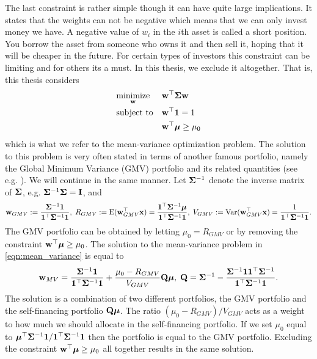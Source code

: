 \documentclass[oneside]{book}\usepackage{knitr}
\begin{document}
The last constraint is rather simple though it can have quite large implications. 
It states that the weights can not be negative which means that we can only invest money we have. 
A negative value of $w_i$ in the $i$th asset is called a short position.
You borrow the asset from someone who owns it and then sell it, hoping that it will be cheaper in the future.
For certain types of investors this constraint can be limiting and for others its a must.
In this thesis, we exclude it altogether. That is, this thesis considers
\begin{equation}\label{eqn:mean_variance}
\begin{aligned}
& \underset{\mathbf{w}}{\text{minimize}} 
& & \mathbf{w}^\top \mathbf{\Sigma} \mathbf{w} \\
& \text{subject to}
& & \mathbf{w}^\top \mathbf{1} = 1 \\
& && \mathbf{w}^\top \mbox{\boldmath$\mu$} \geq \mu_0 \\
\end{aligned}
\end{equation}
which is what we refer to the mean-variance optimization problem. The solution to this problem is very often stated in terms of another famous portfolio, namely the Global Minimum Variance (GMV) portfolio and its related quantities (see e.g. \textcite{Bodnar2009CaIotEFiEM, bodnar2013equivalence, bauder2018bayesian}). We will continue in the same manner. Let $\mathbf{\Sigma}^{-1}$ denote the inverse matrix of $\mathbf{\Sigma}$, e.g. $\mathbf{\Sigma}^{-1}\mathbf{\Sigma} = \mathbf{I}$, and
\begin{equation}
	\mathbf{w}_{GMV} := \frac{\mathbf{\Sigma}^{-1}\mathbf{1}}{\mathbf{1}^\top \mathbf{\Sigma}^{-1}\mathbf{1}}, \; R_{GMV} :=\operatorname{E}(\mathbf{w}_{GMV}^\top\mathbf{x}) = \frac{\mathbf{1}^\top\mathbf{\Sigma}^{-1}\mbox{\boldmath$\mu$}}{\mathbf{1}^\top \mathbf{\Sigma}^{-1}\mathbf{1}}, \;
	V_{GMV} := \operatorname{Var}(\mathbf{w}_{GMV}^\top\mathbf{x}) =\frac{1}{\mathbf{1}^\top \mathbf{\Sigma}^{-1}\mathbf{1}}.
\end{equation}
The GMV portfolio can be obtained by letting $\mu_0=R_{GMV}$ or by removing the constraint $\mathbf{w}^\top \mbox{\boldmath$\mu$} \geq \mu_0$. The solution to the mean-variance problem in \eqref{eqn:mean_variance} is equal to
\begin{equation}\label{eqn:mean_var_solution}
	\mathbf{w}_{MV} = \frac{\mathbf{\Sigma}^{-1}\mathbf{1}}{\mathbf{1}^\top \mathbf{\Sigma}^{-1}\mathbf{1}} + \frac{\mu_0 - R_{GMV}}{V_{GMV}} \mathbf{Q} \mbox{\boldmath$\mu$},\; \mathbf{Q} = \mathbf{\Sigma}^{-1} - \frac{\mathbf{\Sigma}^{-1} \mathbf{1} \mathbf{1}^\top \mathbf{\Sigma}^{-1}}{\mathbf{1}^\top \mathbf{\Sigma}^{-1} \mathbf{1}}.
\end{equation}
The solution is a combination of two different portfolios, the GMV portfolio and the self-financing portfolio $\mathbf{Q} \mbox{\boldmath$\mu$}$. The ratio $(\mu_0 - R_{GMV})/V_{GMV}$ acts as a weight to how much we should allocate in the self-financing portfolio. If we set $\mu_0$ equal to $\mbox{\boldmath$\mu$}^\top \mathbf{\Sigma}^{-1} \mathbf{1} / \mathbf{1}^\top \mathbf{\Sigma}^{-1} \mathbf{1}$ then the portfolio is equal to the GMV portfolio. Excluding the constraint $\mathbf{w}^\top \mbox{\boldmath$\mu$} \geq \mu_0$ all together results in the same solution. 
\end{document}
